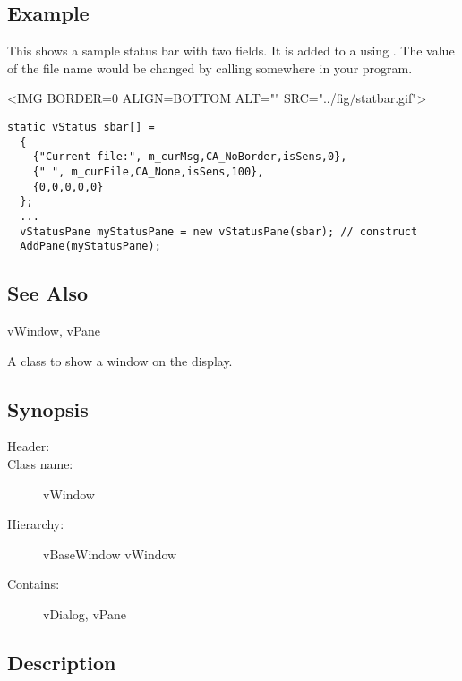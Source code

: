 \subsection* {Example}

This shows a sample status bar with two fields. It is added
to a  using . The value of the
file name would be changed by calling    
 somewhere in your program.

\vspace{.1in}
\small
\begin{rawhtml}
<IMG BORDER=0 ALIGN=BOTTOM ALT="" SRC="../fig/statbar.gif">
\end{rawhtml}
\begin{latexonly}

\end{latexonly}
\normalfont\normalsize

\footnotesize
\begin{verbatim}
static vStatus sbar[] =
  {
    {"Current file:", m_curMsg,CA_NoBorder,isSens,0},
    {" ", m_curFile,CA_None,isSens,100},
    {0,0,0,0,0}
  };
  ...
  vStatusPane myStatusPane = new vStatusPane(sbar); // construct
  AddPane(myStatusPane);
\end{verbatim}
\normalfont\normalsize

\subsection* {See Also}

vWindow, vPane



A class to show a window on the display.

\subsection* {Synopsis}

\begin{description}
	\item [Header:] 
	\item [Class name:] vWindow
 	\item [Hierarchy:] vBaseWindow \rta vWindow
	\item [Contains:] vDialog, vPane
\end{description}

\subsection* {Description}

